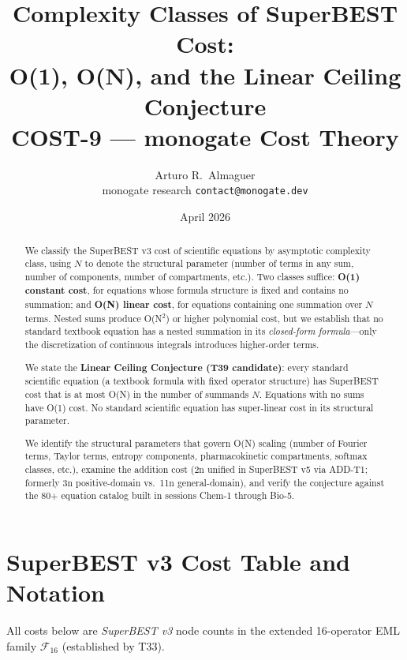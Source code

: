 \documentclass[12pt,a4paper]{article}
\title{Complexity Classes of SuperBEST Cost:\\
       O(1), O(N), and the Linear Ceiling Conjecture\\[6pt]
       \large COST-9 --- monogate Cost Theory}
\author{Arturo R.\ Almaguer\\
\small monogate research \quad \texttt{contact@monogate.dev}}
\date{April 2026}
\theoremstyle{definition}
\begin{document}
\maketitle

\begin{abstract}
We classify the SuperBEST v3 cost of scientific equations by asymptotic
complexity class, using $N$ to denote the structural parameter (number of
terms in any sum, number of components, number of compartments, etc.).
Two classes suffice: \textbf{O(1) constant cost}, for equations whose
formula structure is fixed and contains no summation; and \textbf{O(N)
linear cost}, for equations containing one summation over $N$ terms.
Nested sums produce O(N$^2$) or higher polynomial cost, but we establish
that no standard textbook equation has a nested summation in its
\emph{closed-form formula}---only the discretization of continuous
integrals introduces higher-order terms.

We state the \textbf{Linear Ceiling Conjecture (T39 candidate)}: every
standard scientific equation (a textbook formula with fixed operator
structure) has SuperBEST cost that is at most O(N) in the number of
summands $N$.  Equations with no sums have O(1) cost.  No standard
scientific equation has super-linear cost in its structural parameter.

We identify the structural parameters that govern O(N) scaling (number
of Fourier terms, Taylor terms, entropy components, pharmacokinetic
compartments, softmax classes, etc.), examine the addition cost (2n unified in SuperBEST v5 via ADD-T1;
formerly 3n positive-domain vs.\ 11n general-domain), and verify the
conjecture against the 80$+$ equation catalog built in sessions Chem-1
through Bio-5.
\end{abstract}

\tableofcontents
\bigskip

\section{SuperBEST v3 Cost Table and Notation}
\label{sec:background}

All costs below are \emph{SuperBEST v3} node counts in the extended
16-operator EML family $\mathcal{F}_{16}$ (established by T33).
\end{document}
